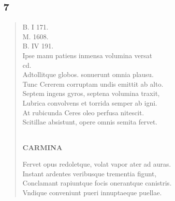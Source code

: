 \documentclass[11pt, a4paper]{report}
\begin{document}
            \subsection*{7}
      \begin{verse}
      B. I 171. \\ M. 1608. \\ B. IV 191. \\ Ipse manu patiens inmensa volumina versat \\ cd. \\ Adtollitque globos. sonuerunt omnia plausu. \\ Tunc Cererem corruptam undis emittit ab alto. \\ Septem ingens gyros, septena volumina traxit, \\ Lubrica convolvens et torrida semper ab igni. \\ At rubicunda Ceres oleo perfusa nitescit. \\ Scitillae absistunt, opere omnis semita fervet. \\ 
        ﻿\pagebreak 
    \begin{center} \textbf{CARMINA} \end{center} \marginpar{[34]} Fervet opus redoletque, volat vapor ater ad auras. \\ Instant ardentes veribusque trementia figunt, \\ Conclamant rapiuntque focis onerantque canistris. \\ Vndique conveniunt pueri innuptaeque puellae. \\ 
      \end{verse}
  
\end{document}
